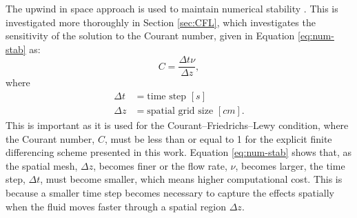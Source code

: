 \documentclass{style/nseJournal}
\begin{document}
The upwind in space approach is used to maintain numerical stability \cite{advecbook}.
This is investigated more thoroughly in Section \ref{sec:CFL}, which investigates the sensitivity of the solution to the Courant number, given in Equation \eqref{eq:num-stab} as:
\begin{equation}
    C = \frac{\Delta t \nu}{\Delta z},
\label{eq:num-stab}
\end{equation}
where
\begin{align}
    \Delta t &= \text{time step $[s]$} \nonumber \\
    \Delta z &= \text{spatial grid size $[cm]$}. 
\end{align}
This is important as it is used for the Courant–Friedrichs–Lewy condition, where the Courant number, $C$, must be less than or equal to 1 for the explicit finite differencing scheme presented in this work.
Equation \eqref{eq:num-stab} shows that, as the spatial mesh, $\Delta z$, becomes finer or the flow rate, $\nu$, becomes larger, the time step, $\Delta t$, must become smaller, which means higher computational cost.
This is because a smaller time step becomes necessary to capture the effects spatially when the fluid moves faster through a spatial region $\Delta z$.

\end{document}

